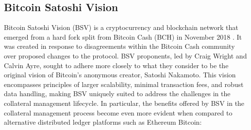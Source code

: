 \subsection{Bitcoin Satoshi Vision}
\label{subsec:bsv}
Bitcoin Satoshi Vision (BSV) is a cryptocurrency and blockchain network that emerged from a hard fork split from Bitcoin Cash (BCH) in November 2018 \citep{bsv_home}. It was created in response to disagreements within the Bitcoin Cash community over proposed changes to the protocol. BSV proponents, led by Craig Wright and Calvin Ayre, sought to adhere more closely to what they consider to be the original vision of Bitcoin's anonymous creator, Satoshi Nakamoto. This vision encompasses principles of larger scalability, minimal transaction fees, and robust data handling, making BSV uniquely suited to address the challenges in the collateral management lifecycle. In particular, the benefits offered by BSV in the collateral management process become even more evident when compared to alternative distributed ledger platforms such as Ethereum Bitcoin:

